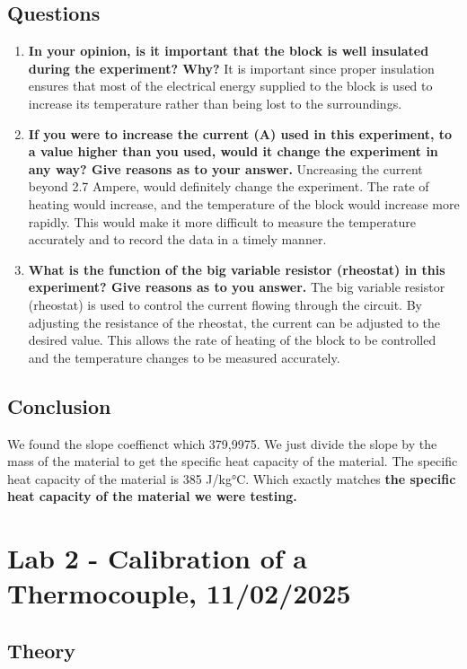 \documentclass[a4paper]{article}
\begin{document}
    \subsection{Questions}
    \begin{enumerate}
        \item \textbf{In your opinion, is it important that the block is well insulated during the experiment? Why?}
        It is important since proper insulation ensures that most of 
        the electrical energy supplied to the block is used to increase its temperature rather than 
        being lost to the surroundings.
        \item \textbf{If you were to increase the current (A) used in this experiment, to a value higher than you used, would it change the experiment in any way? Give reasons as to your answer.}
        Uncreasing the current beyond 2.7 Ampere, would definitely change the experiment. The rate of heating would increase, and the temperature of the block would increase more rapidly. This would make it more difficult to measure the temperature accurately and to record the data in a timely manner.
        \item \textbf{What is the function of the big variable resistor (rheostat) in this experiment? Give reasons as to you answer.}
        The big variable resistor (rheostat) is used to control the current flowing through the circuit. By adjusting the resistance of the rheostat, the current can be adjusted to the desired value. This allows the rate of heating of the block to be controlled and the temperature changes to be measured accurately.
    \end{enumerate}

    \subsection{Conclusion}
    We found the slope coeffienct which 379,9975. We just divide the slope by the mass of the material to get the specific heat capacity of the material. The specific heat capacity of the material is 385 J/kg°C. Which exactly matches \textbf{the specific heat capacity of the material we were testing.}

\section{Lab 2 - Calibration of a Thermocouple, 11/02/2025}

\subsection{Theory}
\end{document}
